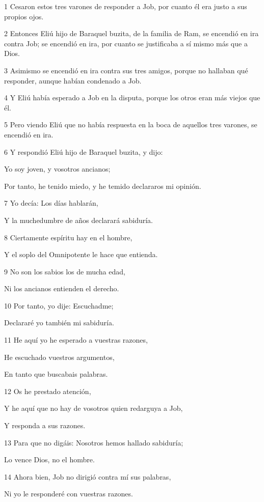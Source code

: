 \par 1 Cesaron estos tres varones de responder a Job, por cuanto él era justo a sus propios ojos.
\par 2 Entonces Eliú hijo de Baraquel buzita, de la familia de Ram, se encendió en ira contra Job; se encendió en ira, por cuanto se justificaba a sí mismo más que a Dios.
\par 3 Asimismo se encendió en ira contra sus tres amigos, porque no hallaban qué responder, aunque habían condenado a Job.
\par 4 Y Eliú había esperado a Job en la disputa, porque los otros eran más viejos que él.
\par 5 Pero viendo Eliú que no había respuesta en la boca de aquellos tres varones, se encendió en ira.
\par 6 Y respondió Eliú hijo de Baraquel buzita, y dijo:
\par Yo soy joven, y vosotros ancianos;
\par Por tanto, he tenido miedo, y he temido declararos mi opinión.
\par 7 Yo decía: Los días hablarán,
\par Y la muchedumbre de años declarará sabiduría.
\par 8 Ciertamente espíritu hay en el hombre,
\par Y el soplo del Omnipotente le hace que entienda.
\par 9 No son los sabios los de mucha edad,
\par Ni los ancianos entienden el derecho.
\par 10 Por tanto, yo dije: Escuchadme;
\par Declararé yo también mi sabiduría.
\par 11 He aquí yo he esperado a vuestras razones,
\par He escuchado vuestros argumentos,
\par En tanto que buscabais palabras.
\par 12 Os he prestado atención,
\par Y he aquí que no hay de vosotros quien redarguya a Job,
\par Y responda a sus razones.
\par 13 Para que no digáis: Nosotros hemos hallado sabiduría;
\par Lo vence Dios, no el hombre.
\par 14 Ahora bien, Job no dirigió contra mí sus palabras,
\par Ni yo le responderé con vuestras razones.

